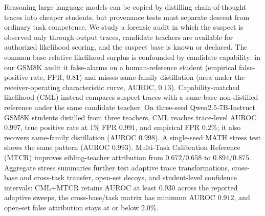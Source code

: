 Reasoning large language models can be copied by distilling chain-of-thought traces
into cheaper students, but provenance tests must separate descent from ordinary task
competence. We study a forensic audit in which the suspect is observed only through
output traces, candidate teachers are available for authorized likelihood scoring,
and the suspect base is known or declared. The common base-relative likelihood
surplus is confounded by candidate capability: in our GSM8K audit it false-alarms
on a human-reference student (empirical false-positive rate, FPR, $0.81$) and misses
same-family distillation (area under the receiver-operating characteristic curve,
AUROC, $0.13$). Capability-matched likelihood (CML) instead compares suspect traces
with a same-base non-distilled reference under the same candidate teacher. On
three-seed Qwen2.5-7B-Instruct GSM8K students distilled from three teachers, CML
reaches trace-level AUROC $0.997$, true positive rate at $1\%$ FPR $0.991$, and
empirical FPR $0.2\%$; it also recovers same-family distillation (AUROC $0.998$). A
single-seed MATH stress test shows the same pattern (AUROC $0.993$). Multi-Task
Calibration Reference (MTCR) improves sibling-teacher attribution from
$0.672$/$0.658$ to $0.894$/$0.875$. Aggregate stress summaries further test adaptive
trace transformations, cross-base and cross-task transfer, open-set decoys, and
student-level confidence intervals: CML+MTCR retains AUROC at least $0.930$ across
the reported adaptive sweeps, the cross-base/task matrix has minimum AUROC $0.912$,
and open-set false attribution stays at or below $2.0\%$.
